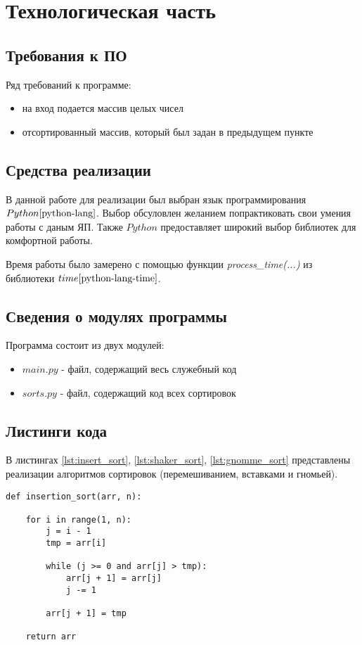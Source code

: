 \chapter{Технологическая часть}

\section{Требования к ПО}
Ряд требований к программе:
\begin{itemize}
	\item на вход подается массив целых чисел 
    \item отсортированный массив, который был задан в предыдущем пункте \newline
\end{itemize}


\section{Средства реализации}
В данной работе для реализации был выбран язык программирования $Python \cite{python-lang}$. Выбор обсуловлен желанием попрактиковать свои умения работы с даным ЯП. Также $Python$ предоставляет широкий выбор библиотек для комфортной работы.

Время работы было замерено с помощью функции \textit{process\_time(...)} из библиотеки $time \cite{python-lang-time}$.

\section{Сведения о модулях программы}
Программа состоит из двух модулей:
\begin{itemize}
	\item $main.py$ - файл, содержащий весь служебный код
    \item $sorts.py$ - файл, содержащий код всех сортировок \newline
\end{itemize}


\section{Листинги кода}

В листингах \ref{lst:insert_sort}, \ref{lst:shaker_sort}, \ref{lst:gnomme_sort} представлены реализации алгоритмов сортировок (перемешиванием, вставками и гномьей).


\begin{lstlisting}[label=lst:insert_sort,caption=Алгоритм сортировки вставками]
    def insertion_sort(arr, n):
    
    for i in range(1, n):
        j = i - 1
        tmp = arr[i]

        while (j >= 0 and arr[j] > tmp):
            arr[j + 1] = arr[j]
            j -= 1

        arr[j + 1] = tmp

    return arr
\end{lstlisting}



